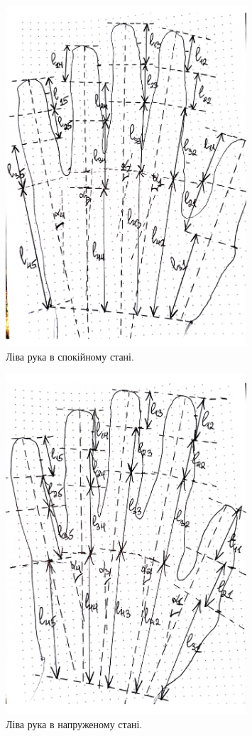 \documentclass{hw_template}
\begin{document}
\begin{figure}[H]
    \centering
    \includegraphics[width=0.8\textwidth]{images/left_rest.pdf}
    \caption{Ліва рука в спокійному стані.}
\end{figure}

\begin{figure}[H]
    \centering
    \includegraphics[width=0.8\textwidth]{images/left_stressed.pdf}
    \caption{Ліва рука в напруженому стані.}
\end{figure}
\end{document}
